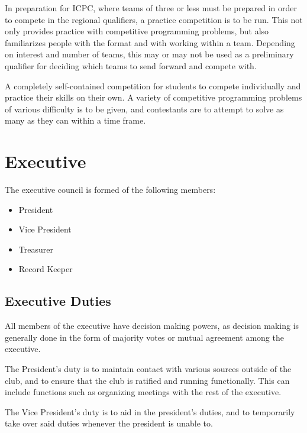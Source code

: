 \documentclass[11pt]{article}
\begin{document}
\vspace{2mm}
\noindent
In preparation for ICPC, where teams of three or less must be prepared in order to compete in the regional qualifiers, a practice competition is to be run. This not only provides practice with competitive programming problems, but also familiarizes people with the format and with working within a team. Depending on interest and number of teams, this may or may not be used as a preliminary qualifier for deciding which teams to send forward and compete with.

\vspace{2mm}
\noindent
A completely self-contained competition for students to compete individually and practice their skills on their own. A variety of competitive programming problems of various difficulty is to be given, and contestants are to attempt to solve as many as they can within a time frame.

\section{Executive}

The executive council is formed of the following members:

\begin{itemize}
  \item President
  \item Vice President
  \item Treasurer
  \item Record Keeper
\end{itemize}

\subsection{Executive Duties}

All members of the executive have decision making powers, as decision making is generally done in the form of majority votes or mutual agreement among the executive.

\vspace{2mm}
\noindent
The President's duty is to maintain contact with various sources outside of the club, and to ensure that the club is ratified and running functionally. This can include functions such as organizing meetings with the rest of the executive.

\vspace{2mm}
\noindent
The Vice President's duty is to aid in the president's duties, and to temporarily take over said duties whenever the president is unable to.
\end{document}
